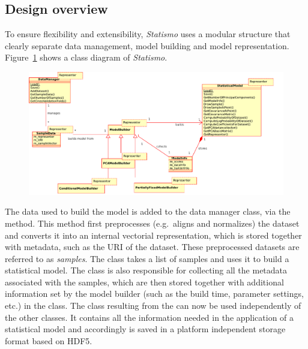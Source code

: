 \documentclass{InsightArticle}
\newcommand{\Statismo}{\emph{Statismo}\xspace}
\begin{document}
\subsection{Design overview}\label{sec:design-overview}
To ensure flexibility and  extensibility, \Statismo uses a modular structure that clearly separate 
data management, model building and model representation. 
Figure~\ref{fig:class-diagram} shows a class diagram of \Statismo.
\begin{figure}
  \includegraphics[width=\textwidth]{pictures/class_diagram.pdf}
  \itkcaption{The core classes in \Statismo}
  \label{fig:class-diagram}
\end{figure}
The data used to build the model is added to the data manager
 class, via the  method. This
method first preprocesses (e.g.\ aligns and normalizes) the dataset
and converts it into an internal vectorial representation, which is
stored together with metadata, such as the URI of the dataset. These
preprocessed datasets are referred to as \emph{samples}. The
 class takes a list of samples and uses it to build
a statistical model. The  class is also responsible
for collecting all the metadata associated with the samples, which are then
stored together with additional information set by the model builder (such as
the build time, parameter settings, etc.) in the 
class. The  class resulting from the
 can now be used independently of the other
classes. It contains all the information needed in the application of
a statistical model and accordingly is saved in a platform independent storage format 
based on HDF5. 
\end{document}
